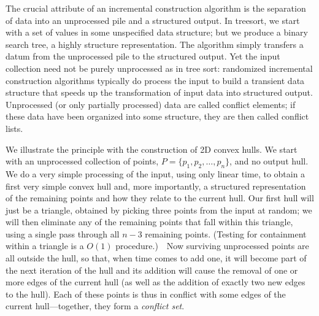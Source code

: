 \documentclass[11pt]{article}
\begin{document}
The crucial attribute of an incremental construction algorithm is the
separation of data into an unprocessed pile and a structured output.
In treesort, we start with a set of values in some unspecified data
structure; but we produce a binary search tree, a highly structure
representation.  The algorithm simply transfers a datum from the
unprocessed pile to the structured output.  Yet the input collection
need not be purely unprocessed as in tree sort: randomized incremental
construction algorithms typically do process the input to build
a transient data structure that speeds up the transformation of input
data into structured output.  Unprocessed (or only partially processed)
data are called conflict elements; if these data have been organized into
some structure, they are then called conflict lists.

We illustrate the principle with the construction of 2D convex hulls.
We start with an unprocessed collection of points, $P=\{p_1,p_2,\ldots,p_n\}$,
and no output hull.  We do a very simple processing of the input, using
only linear time, to obtain a first very simple convex hull and, more
importantly, a structured representation of the remaining points and how
they relate to the current hull.  Our first hull will just be a triangle,
obtained by picking three points from the input at random; we will then
eliminate any of the remaining points that fall within this triangle,
using a single pass through all $n-3$ remaining points.  (Testing for
containment within a triangle is a $O(1)$ procedure.)\ \ Now surviving
unprocessed points are all outside the hull, so that, when time comes
to add one, it will become part of the next iteration of the hull and
its addition will cause the removal of one or more edges of the current
hull (as well as the addition of exactly two new edges to the hull).  Each
of these points is thus in conflict with some edges of the current
hull---together, they form a \emph{conflict set}.
\end{document}
